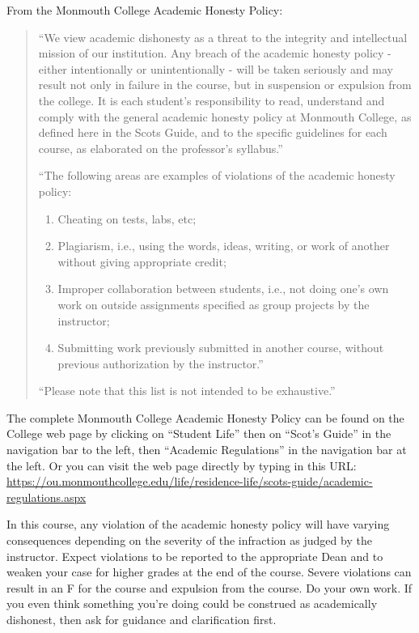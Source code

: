 \documentclass[10pt]{article}
\begin{document}
From the Monmouth College Academic Honesty Policy:
\begin{quote}
  ``We view academic dishonesty as a threat to the integrity and intellectual mission of our institution. Any breach of the academic honesty policy - either intentionally or unintentionally - will be taken seriously and may result not only in failure in the course, but in suspension or expulsion from the college. It is each student’s responsibility to read, understand and comply with the general academic honesty policy at Monmouth College, as defined here in the Scots Guide, and to the specific guidelines for each course, as elaborated on the professor’s syllabus.''

  ``The following areas are examples of violations of the academic honesty policy:
  \begin{enumerate}
  \item Cheating on tests, labs, etc;
  \item Plagiarism, i.e., using the words, ideas, writing, or work of another without giving appropriate credit;
  \item Improper collaboration between students, i.e., not doing one’s own work on outside assignments specified as group projects by the instructor;
  \item Submitting work previously submitted in another course, without previous authorization by the instructor.''
  \end{enumerate}

  ``Please note that this list is not intended to be exhaustive.''
\end{quote}

The complete Monmouth College Academic Honesty Policy can be found on the College web page by clicking on ``Student Life'' then on ``Scot’s Guide'' in the navigation bar to the left, then ``Academic Regulations'' in the navigation bar at the left.  Or you can visit the web page directly by typing in this URL: \url{https://ou.monmouthcollege.edu/life/residence-life/scots-guide/academic-regulations.aspx}

In this course, any violation of the academic honesty policy will have varying consequences depending on the severity of the infraction as judged by the instructor.  Expect violations to be reported to the appropriate Dean and to weaken your case for higher grades at the end of the course. Severe violations can result in an F for the course and expulsion from the course. Do your own work. If you even think something you're doing could be construed as academically dishonest, then ask for guidance and clarification first.
\end{document}
